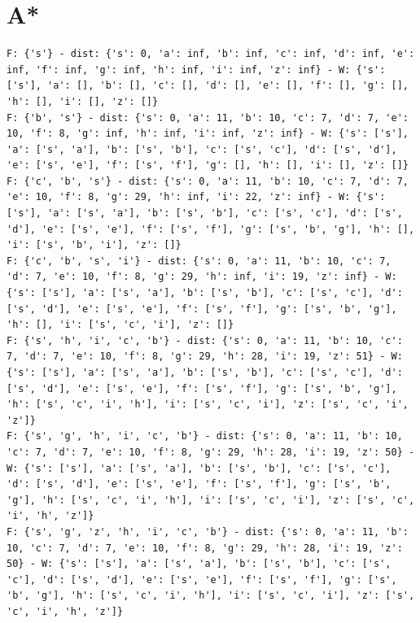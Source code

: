 \documentclass[a4paper,11pt]{report}
\begin{document}
\section{A*}\label{sec:astar}
\begin{verbatim}
F: {'s'} - dist: {'s': 0, 'a': inf, 'b': inf, 'c': inf, 'd': inf, 'e': inf, 'f': inf, 'g': inf, 'h': inf, 'i': inf, 'z': inf} - W: {'s': ['s'], 'a': [], 'b': [], 'c': [], 'd': [], 'e': [], 'f': [], 'g': [], 'h': [], 'i': [], 'z': []}
F: {'b', 's'} - dist: {'s': 0, 'a': 11, 'b': 10, 'c': 7, 'd': 7, 'e': 10, 'f': 8, 'g': inf, 'h': inf, 'i': inf, 'z': inf} - W: {'s': ['s'], 'a': ['s', 'a'], 'b': ['s', 'b'], 'c': ['s', 'c'], 'd': ['s', 'd'], 'e': ['s', 'e'], 'f': ['s', 'f'], 'g': [], 'h': [], 'i': [], 'z': []}
F: {'c', 'b', 's'} - dist: {'s': 0, 'a': 11, 'b': 10, 'c': 7, 'd': 7, 'e': 10, 'f': 8, 'g': 29, 'h': inf, 'i': 22, 'z': inf} - W: {'s': ['s'], 'a': ['s', 'a'], 'b': ['s', 'b'], 'c': ['s', 'c'], 'd': ['s', 'd'], 'e': ['s', 'e'], 'f': ['s', 'f'], 'g': ['s', 'b', 'g'], 'h': [], 'i': ['s', 'b', 'i'], 'z': []}
F: {'c', 'b', 's', 'i'} - dist: {'s': 0, 'a': 11, 'b': 10, 'c': 7, 'd': 7, 'e': 10, 'f': 8, 'g': 29, 'h': inf, 'i': 19, 'z': inf} - W: {'s': ['s'], 'a': ['s', 'a'], 'b': ['s', 'b'], 'c': ['s', 'c'], 'd': ['s', 'd'], 'e': ['s', 'e'], 'f': ['s', 'f'], 'g': ['s', 'b', 'g'], 'h': [], 'i': ['s', 'c', 'i'], 'z': []}
F: {'s', 'h', 'i', 'c', 'b'} - dist: {'s': 0, 'a': 11, 'b': 10, 'c': 7, 'd': 7, 'e': 10, 'f': 8, 'g': 29, 'h': 28, 'i': 19, 'z': 51} - W: {'s': ['s'], 'a': ['s', 'a'], 'b': ['s', 'b'], 'c': ['s', 'c'], 'd': ['s', 'd'], 'e': ['s', 'e'], 'f': ['s', 'f'], 'g': ['s', 'b', 'g'], 'h': ['s', 'c', 'i', 'h'], 'i': ['s', 'c', 'i'], 'z': ['s', 'c', 'i', 'z']}
F: {'s', 'g', 'h', 'i', 'c', 'b'} - dist: {'s': 0, 'a': 11, 'b': 10, 'c': 7, 'd': 7, 'e': 10, 'f': 8, 'g': 29, 'h': 28, 'i': 19, 'z': 50} - W: {'s': ['s'], 'a': ['s', 'a'], 'b': ['s', 'b'], 'c': ['s', 'c'], 'd': ['s', 'd'], 'e': ['s', 'e'], 'f': ['s', 'f'], 'g': ['s', 'b', 'g'], 'h': ['s', 'c', 'i', 'h'], 'i': ['s', 'c', 'i'], 'z': ['s', 'c', 'i', 'h', 'z']}
F: {'s', 'g', 'z', 'h', 'i', 'c', 'b'} - dist: {'s': 0, 'a': 11, 'b': 10, 'c': 7, 'd': 7, 'e': 10, 'f': 8, 'g': 29, 'h': 28, 'i': 19, 'z': 50} - W: {'s': ['s'], 'a': ['s', 'a'], 'b': ['s', 'b'], 'c': ['s', 'c'], 'd': ['s', 'd'], 'e': ['s', 'e'], 'f': ['s', 'f'], 'g': ['s', 'b', 'g'], 'h': ['s', 'c', 'i', 'h'], 'i': ['s', 'c', 'i'], 'z': ['s', 'c', 'i', 'h', 'z']}
\end{verbatim}
\end{document}
